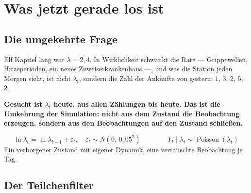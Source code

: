 \chapter{Was jetzt gerade los ist}

\section{Die umgekehrte Frage}

\begin{merksatz}
Elf Kapitel lang war $\lambda = 2{,}4$. In Wirklichkeit schwankt die Rate --- Grippewellen, Hitzeperioden, ein neues Zuweiserkrankenhaus ---, und was die Station jeden Morgen sieht, ist nicht $\lambda_t$, sondern die Zahl der Ankünfte von gestern: $1$, $3$, $2$, $5$, $2$.

\begin{center}
\begin{minipage}{0.9\textwidth}
\textbf{Gesucht ist $\lambda_t$ heute, aus allen Zählungen bis heute. Das ist die Umkehrung der Simulation: nicht aus dem Zustand die Beobachtung erzeugen, sondern aus den Beobachtungen auf den Zustand schließen.}
\end{minipage}
\end{center}

\[ \ln\lambda_t = \ln\lambda_{t-1} + \varepsilon_t,\quad \varepsilon_t\sim N(0,\,0{,}05^2) \qquad\qquad Y_t \mid \lambda_t \sim \operatorname{Poisson}(\lambda_t) \]
Ein verborgener Zustand mit eigener Dynamik, eine verrauschte Beobachtung je Tag.

\begin{center}
\begin{minipage}{0.88\textwidth}
\end{minipage}
\end{center}
\end{merksatz}

\section{Der Teilchenfilter}

